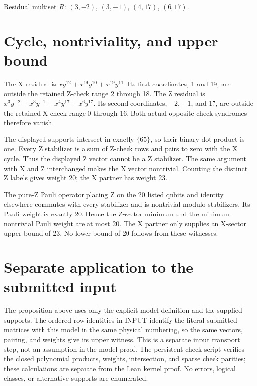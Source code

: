 \documentclass{article}
\begin{document}
Residual multiset \(R\): \((3, -2)\), \((3, -1)\), \((4, 17)\), \((6, 17)\).

\section{Cycle, nontriviality, and upper bound}\label{sec:upper-bound}

The X residual is \(x y^{12} + x^{19} y^{10} + x^{19} y^{11}\). Its first coordinates,
1 and 19, are outside the retained Z-check range 2 through 18.
The Z residual is \(x^3 y^{-2} + x^3 y^{-1} + x^4 y^{17} + x^6 y^{17}\).
Its second coordinates, \(-2\), \(-1\), and 17, are outside the retained X-check
range 0 through 16. Both actual opposite-check syndromes therefore vanish.

The displayed supports intersect in exactly \(\{65\}\), so their binary dot
product is one. Every Z stabilizer is a sum of Z-check rows and pairs to
zero with the X cycle. Thus the displayed Z vector cannot be a Z stabilizer.
The same argument with X and Z interchanged makes the X vector nontrivial.
Counting the distinct Z labels gives weight 20; the X partner has weight 23.

The pure-Z Pauli operator placing Z on the 20 listed qubits and identity
elsewhere commutes with every stabilizer and is nontrivial modulo stabilizers.
Its Pauli weight is exactly 20. Hence the Z-sector minimum and the minimum
nontrivial Pauli weight are at most 20. The X partner only supplies an
X-sector upper bound of 23. No lower bound of 20 follows from these witnesses.

\section{Separate application to the submitted input}\label{sec:application}

The proposition above uses only the explicit model definition and the supplied
supports. The ordered row identities in INPUT identify the literal submitted
matrices with this model in the same physical numbering, so the same vectors,
pairing, and weights give its upper witness. This is a separate input transport
step, not an assumption in the model proof. The persistent check script verifies the
closed polynomial products, weights, intersection, and sparse check parities;
these calculations are separate from the Lean kernel proof. No errors,
logical classes, or alternative supports are enumerated.
\end{document}
